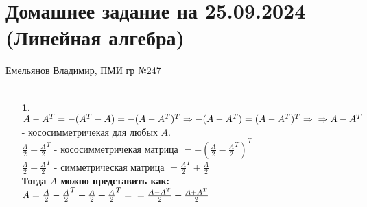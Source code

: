 \documentclass[a4paper]{article}
\renewcommand{\f}[2]{\frac{#1}{#2}}
\renewcommand{\r}{\Rightarrow}
\begin{document}
\section*{Домашнее задание на 25.09.2024 (Линейная алгебра)}
{\large Емельянов Владимир, ПМИ гр №247}\\\\

\begin{enumerate}
    \item[\textbf{1.}]
    $A-A^T = -(A^T-A) = -(A-A^T)^T \r -(A-A^T) = (A-A^T)^T \r\\ \r A-A^T$ - кососимметричекая для любых $A$.\\
    $\f{A}{2}-\f{A}{2}^T$ - кососимметричекая матрица $=-(\f{A}{2}-\f{A}{2}^T)^T$\\
    $\f{A}{2}+\f{A}{2}^T$ - симметрическая матрица $=\f{A}{2}^T+\f{A}{2}$\\
    \textbf{Тогда $A$ можно представить как: }$A = \f{A}{2}-\f{A}{2}^T + \f{A}{2}+\f{A}{2}^T =\\= \f{A-A^T}{2}+\f{A+A^T}{2}$\\


\end{enumerate}
\end{document}
